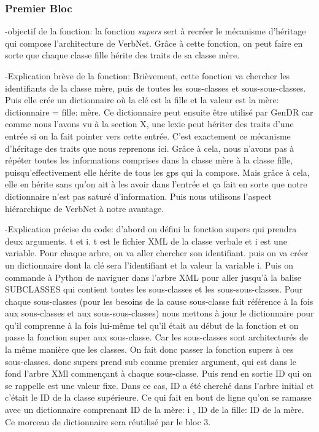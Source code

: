 \subsubsection{Premier Bloc}
-objectif de la fonction: la fonction \emph{supers} sert à recréer le mécanisme d'héritage qui compose l'architecture de VerbNet. Grâce à cette fonction, on peut faire en sorte que chaque classe fille hérite des traits de sa classe mère. 

-Explication brève de la fonction: Brièvement, cette fonction va chercher les identifiants de la classe mère, puis de toutes les sous-classes et sous-sous-classes. Puis elle crée un dictionnaire où la clé est la fille et la valeur est la mère: dictionnaire = {fille: mère}. Ce dictionnaire peut ensuite être utilisé par GenDR car comme nous l'avons vu à la section X, une lexie peut hériter des traits d'une entrée si on la fait pointer vers cette entrée. C'est exactement ce mécanisme d'héritage des traits que nous reprenons ici. Grâce à cela, nous n'avons pas à répéter toutes les informations comprises dans la classe mère à la classe fille, puisqu'effectivement elle hérite de tous les gps qui la compose. Mais grâce à cela, elle en hérite sans qu'on ait à les avoir dans l'entrée et ça fait en sorte que notre dictionnaire n'est pas saturé d'information. Puis nous utilisons l'aspect hiérarchique de VerbNet à notre avantage.

-Explication précise du code:
d'abord on défini la fonction supers qui prendra deux arguments. t et i. t est le fichier XML de la classe verbale et i est une variable. Pour chaque arbre, on va aller chercher son identifiant. puis on va créer un dictionnaire dont la clé sera l'identifiant et la valeur la variable i. Puis on commande à Python de naviguer dans l'arbre XML pour aller jusqu'à la balise SUBCLASSES qui contient toutes les sous-classes et les sous-sous-classes. Pour chaque sous-classes (pour les besoins de la cause sous-classe fait référence à la fois aux sous-classes et aux sous-sous-classes) nous mettons à jour le dictionnaire pour qu'il comprenne à la fois lui-même tel qu'il était au début de la fonction et on passe la fonction super aux sous-classe. Car les sous-classes sont architecturés de la même manière que les classes. On fait donc passer la fonction supers à ces sous-classes. donc supers prend sub comme premier argument, qui est dans le fond l'arbre XMl commençant à chaque sous-classe. Puis rend en sortie ID qui on se rappelle est une valeur fixe. Dans ce cas, ID a été cherché dans l'arbre initial et c'était le ID de la classe supérieure. Ce qui fait en bout de ligne qu'on se ramasse avec un dictionnaire comprenant ID de la mère: i , ID de la fille: ID de la mère. Ce morceau de dictionnaire sera réutilisé par le bloc 3.

